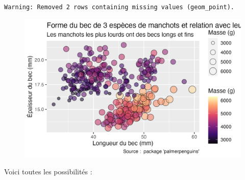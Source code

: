 \documentclass[
  letterpaper,
  DIV=11,
  numbers=noendperiod]{scrreprt}
\begin{document}
\begin{verbatim}
Warning: Removed 2 rows containing missing values (geom_point).
\end{verbatim}

\begin{figure}[H]

{\centering \includegraphics{./03-visualization_files/figure-pdf/unnamed-chunk-92-1.png}

}

\end{figure}

Voici toutes les possibilités :
\end{document}
